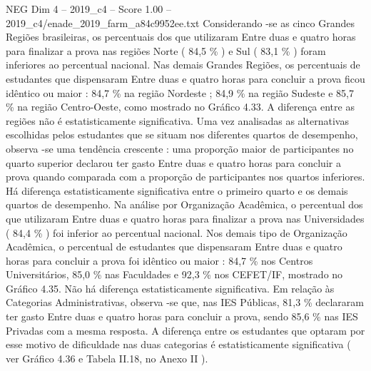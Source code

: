 \begin{textsample}{NEG Dim 4 – 2019\_c4 – Score 1.00 – 2019\_c4/enade\_2019\_farm\_a84c9952ee.txt}
Considerando -se as cinco Grandes Regiões brasileiras, os percentuais dos que utilizaram Entre duas e quatro horas para finalizar a prova nas regiões Norte ( 84,5 \% ) e Sul ( 83,1 \% ) foram inferiores ao percentual nacional.
Nas demais Grandes Regiões, os percentuais de estudantes que dispensaram Entre duas e quatro horas para concluir a prova ficou idêntico ou maior : 84,7 \% na região Nordeste ; 84,9 \% na região Sudeste e 85,7 \% na região Centro-Oeste, como mostrado no Gráfico 4.33.
A diferença entre as regiões não é estatisticamente significativa.
Uma vez analisadas as alternativas escolhidas pelos estudantes que se situam nos diferentes quartos de desempenho, observa -se uma tendência crescente : uma proporção maior de participantes no quarto superior declarou ter gasto Entre duas e quatro horas para concluir a prova quando comparada com a proporção de participantes nos quartos inferiores.
Há diferença estatisticamente significativa entre o primeiro quarto e os demais quartos de desempenho.
Na análise por Organização Acadêmica, o percentual dos que utilizaram Entre duas e quatro horas para finalizar a prova nas Universidades ( 84,4 \% ) foi inferior ao percentual nacional.
Nos demais tipo de Organização Acadêmica, o percentual de estudantes que dispensaram Entre duas e quatro horas para concluir a prova foi idêntico ou maior : 84,7 \% nos Centros Universitários, 85,0 \% nas Faculdades e 92,3 \% nos CEFET/IF, mostrado no Gráfico 4.35.
Não há diferença estatisticamente significativa.
Em relação às Categorias Administrativas, observa -se que, nas IES Públicas, 81,3 \% declararam ter gasto Entre duas e quatro horas para concluir a prova, sendo 85,6 \% nas IES Privadas com a mesma resposta.
A diferença entre os estudantes que optaram por esse motivo de dificuldade nas duas categorias é estatisticamente significativa ( ver Gráfico 4.36 e Tabela II.18, no Anexo II ).

\end{textsample}
